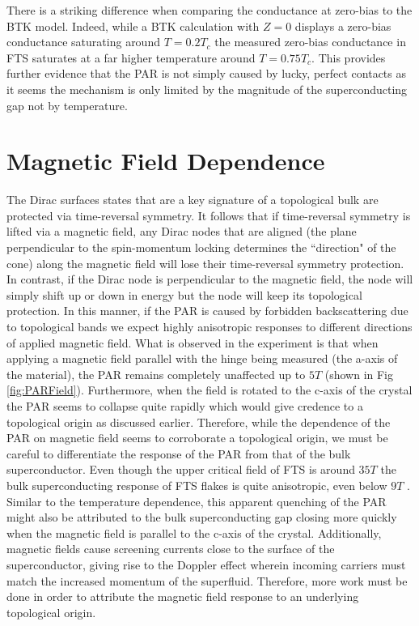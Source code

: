 There is a striking difference when comparing the conductance at zero-bias to the \ac{BTK} model. Indeed, while a \ac{BTK} calculation with $Z=0$ displays a zero-bias conductance saturating around $T=0.2T_{c}$ the measured zero-bias conductance in \ac{FTS} saturates at a far higher temperature around $T = 0.75T_{c}$. This provides further evidence that the \ac{PAR} is not simply caused by lucky, perfect contacts as it seems the mechanism is only limited by the magnitude of the superconducting gap not by temperature.  

\section{Magnetic Field Dependence}
The Dirac surfaces states that are a key signature of a topological bulk are protected via time-reversal symmetry. It follows that if time-reversal symmetry is lifted via a magnetic field, any Dirac nodes that are aligned (the plane perpendicular to the spin-momentum locking determines the ``direction" of the cone) along the magnetic field will lose their time-reversal symmetry protection. In contrast, if the Dirac node is perpendicular to the magnetic field, the node will simply shift up or down in energy but the node will keep its topological protection. In this manner, if the \ac{PAR} is caused by forbidden backscattering due to topological bands we expect highly anisotropic responses to different directions of applied magnetic field. What is observed in the experiment is that when applying a magnetic field parallel with the hinge being measured (the a-axis of the material), the \ac{PAR} remains completely unaffected up to $5 T$ (shown in Fig \ref{fig:PARField}). Furthermore, when the field is rotated to the c-axis of the crystal the \ac{PAR} seems to collapse quite rapidly which would give credence to a topological origin as discussed earlier. Therefore, while the dependence of the \ac{PAR} on magnetic field seems to corroborate a topological origin, we must be careful to differentiate the response of the \ac{PAR} from that of the bulk superconductor. Even though the upper critical field of \ac{FTS} is around $35 T$\cite{Mele2012} the bulk superconducting response of \ac{FTS} flakes is quite anisotropic, even below $9 T$ \cite{zalic2019}. Similar to the temperature dependence, this apparent quenching of the \ac{PAR} might also be attributed to the bulk superconducting gap closing more quickly when the magnetic field is parallel to the c-axis of the crystal\cite{zalic2019}. Additionally, magnetic fields cause screening currents close to the surface of the superconductor, giving rise to the Doppler effect wherein incoming carriers must match the increased momentum of the superfluid\cite{Zareapour2012}. Therefore, more work must be done in order to attribute the magnetic field response to an underlying topological origin.
